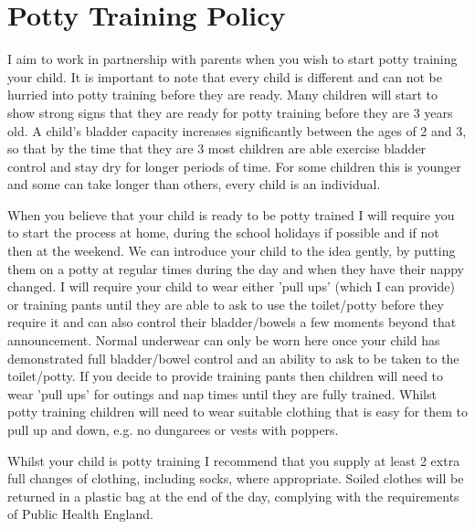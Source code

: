 

\section{Potty Training Policy}

I aim to work in partnership with parents when you wish to start potty training your child. It is important to note that every child is different and can not be hurried into potty training before they are ready. Many children will start to show strong signs that they are ready for potty training before they are 3 years old. A child's bladder capacity increases significantly between the ages of 2 and 3, so that by the time that they are 3 most children are able exercise bladder control and stay dry for longer periods of time. For some children this is younger and some can take longer than others, every child is an individual.

When you believe that your child is ready to be potty trained I will require you to start the process at home, during the school holidays if possible and if not then at the weekend. We can introduce your child to the idea gently, by putting them on a potty at regular times during the day and when they have their nappy changed. I will require your child to wear either 'pull ups' (which I can provide) or training pants until they are able to ask to use the toilet/potty before they require it and can also control their bladder/bowels a few moments beyond that announcement. Normal underwear can only be worn here once your child has demonstrated full bladder/bowel control and an ability to ask to be taken to the toilet/potty. If you decide to provide training pants then children will need to wear 'pull ups' for outings and nap times until they are fully trained. Whilst potty training children will need to wear suitable clothing that is easy for them to pull up and down, e.g. no dungarees or vests with poppers. 

Whilst your child is potty training I recommend that you supply at least 2 extra full changes of clothing, including socks, where appropriate. Soiled clothes will be returned in a plastic bag at the end of the day, complying with the requirements of Public Health England.

